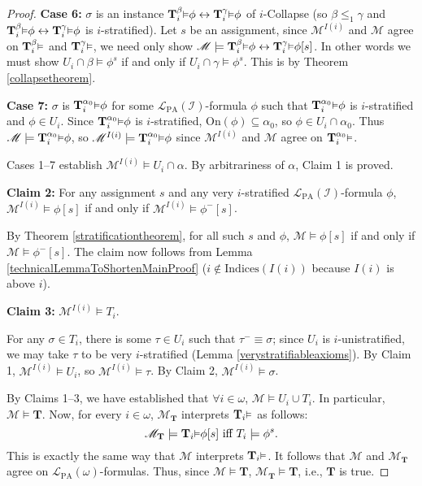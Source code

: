 \documentclass[reqno]{article}
\theoremstyle{definition}
\def\L{\mathscr{L}}
\def\M{\mathscr{M}}
\def\T{\mathbf{T}}
\def\indices{\mathrm{Indices}}
\def\LPA{\L_{\mathrm{PA}}}
\def\indset{\mathcal I}
\def\onset{\mathrm{On}}
\renewcommand{\Pr}[1]{\T_{#1}\mbox{\small${\vDash}$}}
\newcommand{\Prr}[2]{\T^{#1}_{#2}\mbox{\small${\vDash}$}}
\newcommand{\case}[1]{\textbf{Case #1:}}
\newcommand{\claim}[1]{\textbf{Claim #1:}}
\begin{document}
\begin{proof}
\item
\case6
$\sigma$ is an instance $\Prr\beta i\phi\leftrightarrow\Prr\gamma i\phi$
of $i$-Collapse (so $\beta\leq_1\gamma$ and $\Prr\beta i\phi\leftrightarrow\Prr\gamma i\phi$ is
$i$-stratified).
Let $s$ be an assignment,
since $\M^{I(i)}$ and $\M$ agree
on $\Prr\beta i$ and $\Prr\gamma i$, we need only show
$\M\models\Prr\beta i\phi\leftrightarrow\Prr\gamma i\phi[s]$.
In other words we must show $U_i\cap\beta\models\phi^s$
if and only if $U_i\cap\gamma\models\phi^s$.
This is by Theorem \ref{collapsetheorem}.

\item
\case7
$\sigma$ is $\Prr{\alpha_0}i\phi$ for some $\LPA(\indset)$-formula $\phi$
such that $\Prr{\alpha_0}i\phi$ is $i$-stratified and $\phi\in U_i$.
Since $\Prr{\alpha_0}i\phi$
is $i$-stratified, $\onset(\phi)\subseteq\alpha_0$, so $\phi\in U_i\cap\alpha_0$.
Thus $\M\models \Prr{\alpha_0}i\phi$,
so $\M^{I(i)}\models \Prr{\alpha_0}i\phi$ since
$\M^{I(i)}$ and $\M$ agree on $\Prr{\alpha_0}i$.

\item
Cases 1--7
establish $\M^{I(i)}\models U_i\cap\alpha$.
By arbitrariness of $\alpha$, Claim 1 is proved.

\item
\claim2
For any assignment $s$
and any very $i$-stratified $\LPA(\indset)$-formula $\phi$,
$\M^{I(i)}\models\phi[s]$ if and only if
$\M^{I(i)}\models\phi^-[s]$.

\item
By Theorem \ref{stratificationtheorem}, for all such $s$ and $\phi$,
$\M\models\phi[s]$ if and only if $\M\models\phi^-[s]$.
The claim now follows from Lemma \ref{technicalLemmaToShortenMainProof}
($i\not\in\indices(I(i))$ because $I(i)$ is above $i$).

\item
\claim3
$\M^{I(i)}\models T_i$.

\item
For any $\sigma\in T_i$,
there is some $\tau\in U_i$ such that $\tau^-\equiv\sigma$;
since $U_i$ is $i$-unistratified, we may take $\tau$ to be very $i$-stratified
(Lemma \ref{verystratifiableaxioms}).
By Claim 1, $\M^{I(i)}\models U_i$,
so $\M^{I(i)}\models\tau$.
By Claim 2, $\M^{I(i)}\models\sigma$.

\item
By Claims 1--3, we have established that $\forall i\in\omega$,
$\M\models U_i\cup T_i$.
In particular, $\M\models \T$.
Now, for every $i\in\omega$, $\M_\T$ interprets $\Pr i$ as follows:
\[
\M_\T\models \Pr i \phi[s] \mbox{ iff } T_i\models \phi^s.
\]
This is exactly the same way that $\M$ interprets $\Pr i$.
It follows that $\M$ and $\M_\T$ agree on $\LPA(\omega)$-formulas.
Thus, since $\M\models\T$, $\M_\T\models \T$, i.e., $\T$ is true.
\end{proof}
\end{document}
